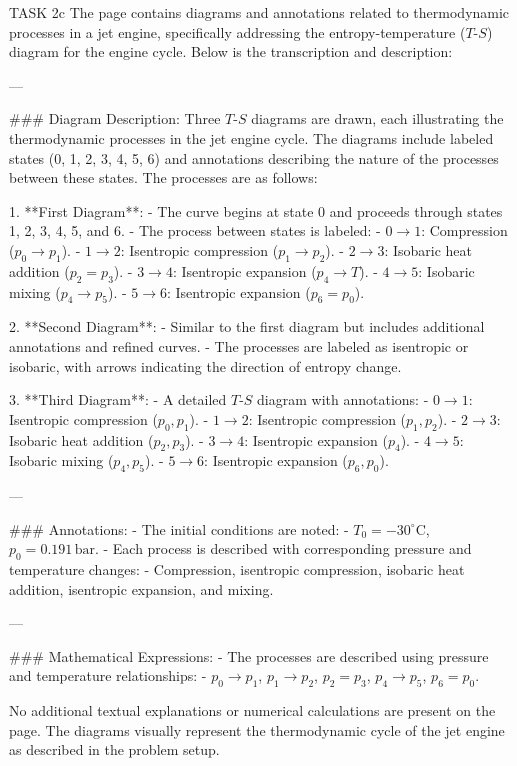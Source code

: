 TASK 2c  
The page contains diagrams and annotations related to thermodynamic processes in a jet engine, specifically addressing the entropy-temperature (\(T\)-\(S\)) diagram for the engine cycle. Below is the transcription and description:

---

### Diagram Description:
Three \(T\)-\(S\) diagrams are drawn, each illustrating the thermodynamic processes in the jet engine cycle. The diagrams include labeled states (0, 1, 2, 3, 4, 5, 6) and annotations describing the nature of the processes between these states. The processes are as follows:

1. **First Diagram**:
   - The curve begins at state 0 and proceeds through states 1, 2, 3, 4, 5, and 6.
   - The process between states is labeled:
     - \(0 \rightarrow 1\): Compression (\(p_0 \rightarrow p_1\)).
     - \(1 \rightarrow 2\): Isentropic compression (\(p_1 \rightarrow p_2\)).
     - \(2 \rightarrow 3\): Isobaric heat addition (\(p_2 = p_3\)).
     - \(3 \rightarrow 4\): Isentropic expansion (\(p_4 \rightarrow T\)).
     - \(4 \rightarrow 5\): Isobaric mixing (\(p_4 \rightarrow p_5\)).
     - \(5 \rightarrow 6\): Isentropic expansion (\(p_6 = p_0\)).

2. **Second Diagram**:
   - Similar to the first diagram but includes additional annotations and refined curves.
   - The processes are labeled as isentropic or isobaric, with arrows indicating the direction of entropy change.

3. **Third Diagram**:
   - A detailed \(T\)-\(S\) diagram with annotations:
     - \(0 \rightarrow 1\): Isentropic compression (\(p_0, p_1\)).
     - \(1 \rightarrow 2\): Isentropic compression (\(p_1, p_2\)).
     - \(2 \rightarrow 3\): Isobaric heat addition (\(p_2, p_3\)).
     - \(3 \rightarrow 4\): Isentropic expansion (\(p_4\)).
     - \(4 \rightarrow 5\): Isobaric mixing (\(p_4, p_5\)).
     - \(5 \rightarrow 6\): Isentropic expansion (\(p_6, p_0\)).

---

### Annotations:
- The initial conditions are noted:
  - \(T_0 = -30^\circ\text{C}\), \(p_0 = 0.191 \, \text{bar}\).
- Each process is described with corresponding pressure and temperature changes:
  - Compression, isentropic compression, isobaric heat addition, isentropic expansion, and mixing.

---

### Mathematical Expressions:
- The processes are described using pressure and temperature relationships:
  - \(p_0 \rightarrow p_1\), \(p_1 \rightarrow p_2\), \(p_2 = p_3\), \(p_4 \rightarrow p_5\), \(p_6 = p_0\).

No additional textual explanations or numerical calculations are present on the page. The diagrams visually represent the thermodynamic cycle of the jet engine as described in the problem setup.
